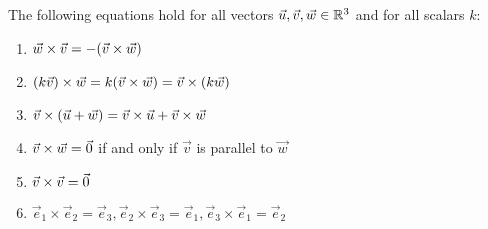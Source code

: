 \documentclass[a4paper,8pt]{article}
\begin{document}
\begin{outline}
    The following equations hold for all vectors \(\vec{u}, \vec{v}, \vec{w} \in \mathbb{R}^3\) and for all scalars \(k\):
    \begin{enumerate}
      \item \(\vec{w}\times\vec{v} = -(\vec{v}\times\vec{w})\)
      \item \((k\vec{v})\times\vec{w} = k(\vec{v}\times\vec{w}) = \vec{v}\times(k\vec{w})\)
      \item \(\vec{v}\times(\vec{u}+\vec{w})=\vec{v}\times\vec{u}+\vec{v}\times\vec{w}\)
      \item \(\vec{v}\times\vec{w}=\vec{0}\) if and only if \(\vec{v}\) is parallel to \(\vec{w}\)
      \item \(\vec{v}\times\vec{v} = \vec{0}\)
      \item \(\vec{e}_1\times\vec{e}_2=\vec{e}_3,\vec{e}_2\times\vec{e}_3=\vec{e}_1,\vec{e}_3\times\vec{e}_1=\vec{e}_2\)
    \end{enumerate}

\end{outline}
\end{document}
